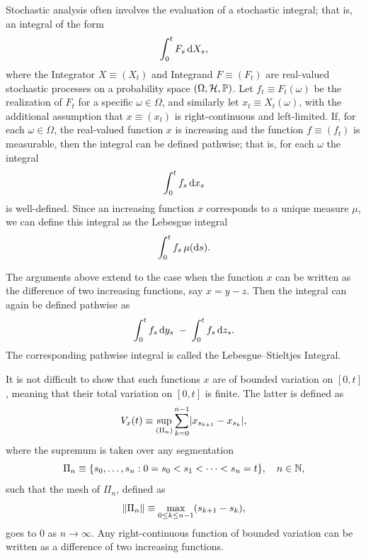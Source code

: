 Stochastic analysis often involves the evaluation of a stochastic integral; that is, an integral of the form
\begin{equation}\label{eq:StochasticIntegral}
	\int_0^t F_s \, \mathrm{d} X_s,
\end{equation}
where the Integrator \(X \equiv (X_t)\) and Integrand \(F \equiv (F_t)\) are real-valued stochastic processes on a probability space \((\Omega, \mathcal{H}, \mathbb{P})\). Let \(f_t \equiv F_t(\omega)\) be the realization of \(F_t\) for a specific \(\omega \in \Omega\), and similarly let \(x_t \equiv X_t(\omega)\), with the additional assumption that \(x \equiv (x_t)\) is right-continuous and left-limited. If, for each \(\omega \in \Omega\), the real-valued function \(x\) is increasing and the function \(f \equiv (f_t)\) is measurable, then the integral can be defined pathwise; that is, for each \(\omega\) the integral
\begin{equation}\label{eq:PathwiseIntegral}
	\int_0^t f_s \, \mathrm{d} x_s
\end{equation}
is well-defined. Since an increasing function \(x\) corresponds to a unique measure \(\mu\), we can define this integral as the Lebesgue integral
\begin{equation}\label{eq:LebesgueMeasureIntegral}
	\int_0^t f_s \, \mu(\mathrm{d} s).
\end{equation}

The arguments above extend to the case when the function \(x\) can be written as the difference of two increasing functions, say \(x = y - z\). Then the integral can again be defined pathwise as
\begin{equation}\label{eq:LebesgueStieltjesDecomposition}
	\int_0^t f_s \, \mathrm{d} y_s \;-\; \int_0^t f_s \, \mathrm{d} z_s.
\end{equation}
The corresponding pathwise integral is called the Lebesgue–Stieltjes Integral.

It is not difficult to show that such functions \(x\) are of bounded variation on \([0, t]\), meaning that their total variation on \([0, t]\) is finite. The latter is defined as
\begin{equation}\label{eq:TotalVariation}
	V_x(t) \equiv \sup_{(\Pi_n)} \sum_{k=0}^{n-1} \lvert x_{s_{k+1}} - x_{s_k}\rvert,
\end{equation}
where the supremum is taken over any segmentation
\begin{equation}\label{eq:Segmentation}
	\Pi_n \equiv \{s_0, \dots, s_n : 0 = s_0 < s_1 < \dots < s_n = t\}, \quad n \in \mathbb{N},
\end{equation}
such that the mesh of \(\Pi_n\), defined as
\begin{equation}\label{eq:MeshDefinition}
	\lVert\Pi_n\rVert \equiv \max_{0 \le k \le n-1} (s_{k+1} - s_k),
\end{equation}
goes to \(0\) as \(n \to \infty\). Any right-continuous function of bounded variation can be written as a difference of two increasing functions.

